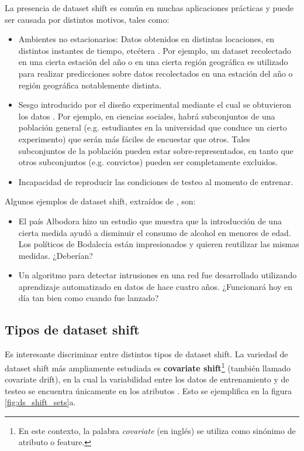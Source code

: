 La presencia de dataset shift es común en muchas aplicaciones prácticas y puede ser causada por distintos motivos, tales como:

\begin{itemize}
\item Ambientes no estacionarios: Datos obtenidos en distintas locaciones, en distintos instantes de tiempo, etcétera \cite{quinonero2009dataset} \cite{adaptative_learning} \cite{MORENOTORRES2012521}. Por ejemplo, un dataset recolectado en una cierta estación del año o en una cierta región geográfica es utilizado para realizar predicciones sobre datos recolectados en una estación del año o región geográfica notablemente distinta. 
\item Sesgo introducido por el diseño experimental mediante el cual se obtuvieron los datos \cite{MORENOTORRES2012521}. Por ejemplo, en ciencias sociales, habrá subconjuntos de una población general (e.g. estudiantes en la universidad que conduce un cierto experimento) que serán más fáciles de encuestar que otros. Tales subconjuntos de la población pueden estar sobre-representados, en tanto que otros subconjuntos (e.g. convictos) pueden ser completamente excluidos.
\item Incapacidad de reproducir las condiciones de testeo al momento de entrenar.
\end{itemize}

Algunos ejemplos de dataset shift, extraídos de \cite{quinonero2009dataset}, son:

\begin{itemize}
\item El país Albodora hizo un estudio que muestra que la introducción de una cierta medida ayudó a disminuir el consumo de alcohol en menores de edad. Los políticos de Bodalecia están impresionados y quieren reutilizar las mismas medidas. ¿Deberían?
\item Un algoritmo para detectar intrusiones en una red fue desarrollado utilizando aprendizaje automatizado en datos de hace cuatro años. ¿Funcionará hoy en día tan bien como cuando fue lanzado?
\end{itemize}

\subsection{Tipos de dataset shift}

Es interesante discriminar entre distintos tipos de dataset shift. La variedad de dataset shift más ampliamente estudiada es \textbf{covariate shift}\footnote{En este contexto, la palabra \textit{covariate} (en inglés) se utiliza como sinónimo de atributo o feature.} (también llamado covariate drift), en la cual la variabilidad entre los datos de entrenamiento y de testeo se encuentra únicamente en los atributos \cite{non-stationary} \cite{quinonero2009dataset} \cite{MORENOTORRES2012521} \cite{kouw2019introduction}. Esto se ejemplifica en la figura \ref{fig:ds_shift_sets}a. \\


